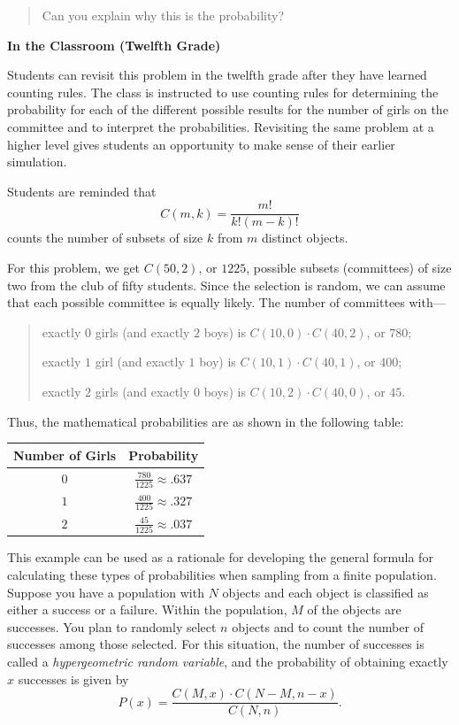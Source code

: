 {\begin{quote}
      Can you explain why this is the probability?
    \end{quote}\vspace{.25\baselineskip}

    \textbf{In the Classroom (Twelfth Grade)}

    Students can revisit this problem in the twelfth grade after they have learned counting rules. The class is instructed to use counting rules for determining the probability for each of the different possible results for the number of girls on the committee and to interpret the probabilities. Revisiting the same problem at a higher level gives students an opportunity to make sense of their earlier simulation.

    Students are reminded that
    $$
      C(m,k)=\frac{m!}{k!(m-k)!}
    $$
    counts the number of subsets of size $k$ from $m$ distinct objects.

    For this problem, we get $C(50, 2)$, or $1225$, possible subsets (committees) of size two from the club of fifty students. Since the selection is random, we can assume that each possible committee is equally likely. The number of committees with---
    \begin{quote}
      exactly $0$ girls (and exactly $2$ boys) is $C(10, 0) \cdot C(40, 2)$, or $780$;

      exactly $1$ girl (and exactly $1$ boy) is $C(10, 1) \cdot C(40, 1)$, or $400$;

      exactly $2$ girls (and exactly $0$ boys) is $C(10, 2) \cdot C(40, 0)$, or $45$.
    \end{quote}

    Thus, the mathematical probabilities are as shown in the following table:

    \begin{center}
    \begin{tabular}{|c|c|}
    \hline
    Number of Girls & Probability \\
    \hline
    $0$ & $\frac{780}{1225}\approx .637$ \\
    \hline
    $1$ & $\frac{400}{1225}\approx .327$ \\
    \hline
    $2$ & $\frac{45}{1225}\approx .037$ \\
    \hline
    \end{tabular}
    \end{center}\vspace{.25\baselineskip}

    This example can be used as a rationale for developing the general formula for calculating these types of probabilities when sampling from a finite population. Suppose you have a population with $N$ objects and each object is classified as either a success or a failure. Within the population, $M$ of the objects are successes. You plan to randomly select $n$ objects and to count the number of successes among those selected. For this situation, the number of successes is called a \emph{hypergeometric random variable}, and the probability of obtaining exactly $x$ successes is given by
    $$
      P(x)=\frac{C(M,x)\cdot C(N-M,n-x)}{C(N,n)}.
    $$

}
